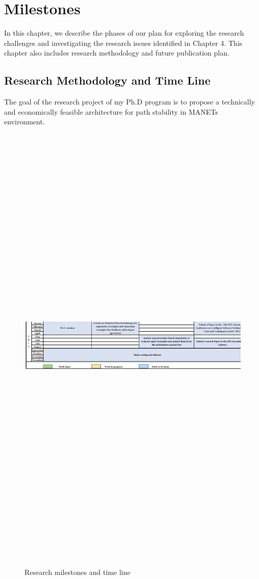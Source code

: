 \setcounter{chapter}{4}
\chapter{Milestones}
In this chapter, we describe the phases of our plan for exploring the research challenges and investigating the research issues identified in Chapter 4. This chapter also includes research methodology and future publication plan.

\section {Research Methodology and Time Line}

    \par The goal of the research project of my Ph.D program is to propose a technically and economically feasible architecture for path stability in MANETs environment.

    \begin{figure}
                \begin{center}
                \includegraphics[width=16cm, height=22cm]{Figures/timetable.eps}\label{Timetable}
                \caption{Research milestones and time line}
                \end{center}
\end{figure}

